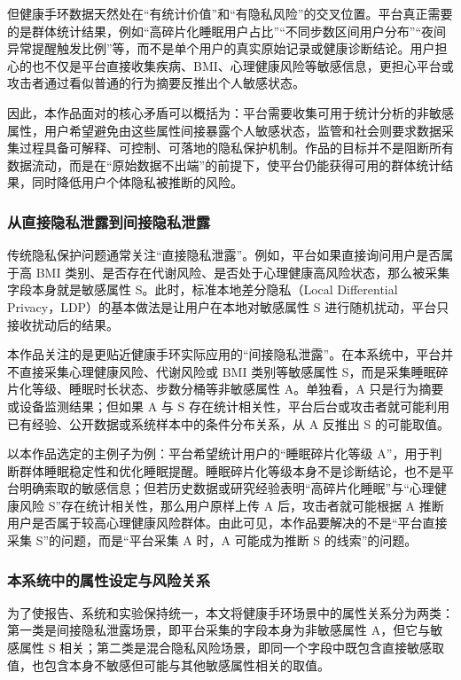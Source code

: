 \documentclass{cumcmthesis}
\numberwithin{equation}{section}
\numberwithin{figure}{section}
\numberwithin{table}{section}
\begin{document}
但健康手环数据天然处在“有统计价值”和“有隐私风险”的交叉位置。平台真正需要的是群体统计结果，例如“高碎片化睡眠用户占比”“不同步数区间用户分布”“夜间异常提醒触发比例”等，而不是单个用户的真实原始记录或健康诊断结论。用户担心的也不仅是平台直接收集疾病、BMI、心理健康风险等敏感信息，更担心平台或攻击者通过看似普通的行为摘要反推出个人敏感状态。

因此，本作品面对的核心矛盾可以概括为：平台需要收集可用于统计分析的非敏感属性，用户希望避免由这些属性间接暴露个人敏感状态，监管和社会则要求数据采集过程具备可解释、可控制、可落地的隐私保护机制。作品的目标并不是阻断所有数据流动，而是在“原始数据不出端”的前提下，使平台仍能获得可用的群体统计结果，同时降低用户个体隐私被推断的风险。

\subsubsection{从直接隐私泄露到间接隐私泄露}

传统隐私保护问题通常关注“直接隐私泄露”。例如，平台如果直接询问用户是否属于高 BMI 类别、是否存在代谢风险、是否处于心理健康高风险状态，那么被采集字段本身就是敏感属性 S。此时，标准本地差分隐私（Local Differential Privacy，LDP）的基本做法是让用户在本地对敏感属性 S 进行随机扰动，平台只接收扰动后的结果。

本作品关注的是更贴近健康手环实际应用的“间接隐私泄露”。在本系统中，平台并不直接采集心理健康风险、代谢风险或 BMI 类别等敏感属性 S，而是采集睡眠碎片化等级、睡眠时长状态、步数分桶等非敏感属性 A。单独看，A 只是行为摘要或设备监测结果；但如果 A 与 S 存在统计相关性，平台后台或攻击者就可能利用已有经验、公开数据或系统样本中的条件分布关系，从 A 反推出 S 的可能取值。

以本作品选定的主例子为例：平台希望统计用户的“睡眠碎片化等级 A”，用于判断群体睡眠稳定性和优化睡眠提醒。睡眠碎片化等级本身不是诊断结论，也不是平台明确索取的敏感信息；但若历史数据或研究经验表明“高碎片化睡眠”与“心理健康风险 S”存在统计相关性，那么用户原样上传 A 后，攻击者就可能根据 A 推断用户是否属于较高心理健康风险群体。由此可见，本作品要解决的不是“平台直接采集 S”的问题，而是“平台采集 A 时，A 可能成为推断 S 的线索”的问题。

\subsubsection{本系统中的属性设定与风险关系}

为了使报告、系统和实验保持统一，本文将健康手环场景中的属性关系分为两类：第一类是间接隐私泄露场景，即平台采集的字段本身为非敏感属性 A，但它与敏感属性 S 相关；第二类是混合隐私风险场景，即同一个字段中既包含直接敏感取值，也包含本身不敏感但可能与其他敏感属性相关的取值。
\end{document}
